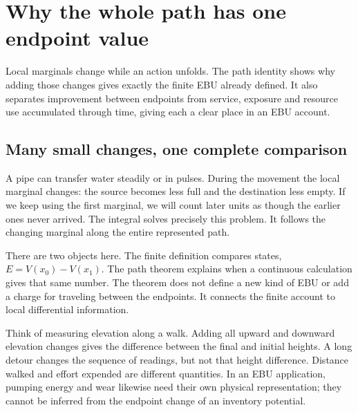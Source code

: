 \chapter{Why the whole path has one endpoint value}\label{ch:path}

Local marginals change while an action unfolds. The path identity shows why adding those changes gives exactly the finite EBU already defined. It also separates improvement between endpoints from service, exposure and resource use accumulated through time, giving each a clear place in an EBU account.


\section{Many small changes, one complete comparison}
A pipe can transfer water steadily or in pulses. During the movement the local marginal changes: the source becomes less full and the destination less empty. If we keep using the first marginal, we will count later units as though the earlier ones never arrived. The integral solves precisely this problem. It follows the changing marginal along the entire represented path.

There are two objects here. The finite definition compares states, $E=V(x_0)-V(x_1)$. The path theorem explains when a continuous calculation gives that same number. The theorem does not define a new kind of EBU or add a charge for traveling between the endpoints. It connects the finite account to local differential information.

Think of measuring elevation along a walk. Adding all upward and downward elevation changes gives the difference between the final and initial heights. A long detour changes the sequence of readings, but not that height difference. Distance walked and effort expended are different quantities. In an EBU application, pumping energy and wear likewise need their own physical representation; they cannot be inferred from the endpoint change of an inventory potential.

